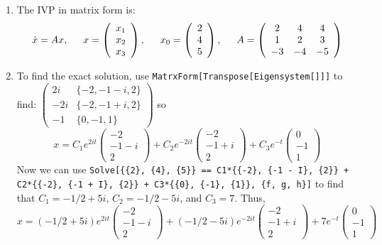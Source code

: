 \documentclass[11pt,answers]{exam}
\begin{document}
\begin{questions}
\begin{solution}
\begin{enumerate}
\item The IVP in matrix form is:
\[
\dot{x} = Ax, \hbox{\hspace{1.5em}} x = \left(\begin{array}{c}x_1 \\ x_2 \\ x_3\end{array}\right), \hbox{\hspace{1.5em}} x_0 = \left(\begin{array}{c}2 \\ 4 \\ 5\end{array}\right), \hbox{\hspace{1.5em}} A = \left(\begin{array}{ccc} 2 & 4 & 4 \\ 1 & 2 & 3 \\ -3 & -4 & -5 \end{array}\right)
\]
\item To find the exact solution, use \texttt{MatrxForm[Transpose[Eigensystem[]]]} to find:
\newline $\displaystyle \left(\begin{array}{cc} 2i & \{-2, -1-i, 2\} \\ -2i & \{ -2, -1 + i, 2 \} \\ -1 & \{ 0, -1, 1 \} \end{array}\right)$ so 
\[
x = C_1 e^{2it}\left(\begin{array}{c}-2 \\ -1-i \\ 2\end{array}\right) + C_2e^{-2it}\left(\begin{array}{c} -2 \\ -1 + i \\ 2 \end{array}\right) + C_3e^{-t}\left(\begin{array}{c}0 \\ -1 \\ 1\end{array}\right)
\]
Now we can use \texttt{Solve[\{\{2\}, \{4\}, \{5\}\} == C1*\{\{-2\}, \{-1 - I\}, \{2\}\} + C2*\{\{-2\}, \{-1 + I\}, \{2\}\} + C3*\{\{0\}, \{-1\}, \{1\}\}, \{f, g, h\}]} to find that $C_1 = -1/2 + 5i$, $C_2 = -1/2 - 5i$, and $C_3 = 7$.  Thus,
\[
x = \left(-1/2 + 5i\right) e^{2it}\left(\begin{array}{c}-2 \\ -1-i \\ 2\end{array}\right) + \left( -1/2 - 5i \right)e^{-2it}\left(\begin{array}{c} -2 \\ -1 + i \\ 2 \end{array}\right) + 7e^{-t}\left(\begin{array}{c}0 \\ -1 \\ 1\end{array}\right)
\]
\end{enumerate}
\end{solution}
\end{questions}
\end{document}
